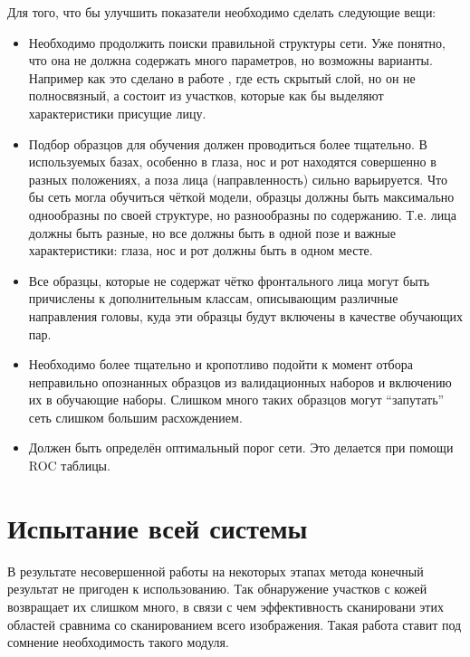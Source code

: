 \documentclass[12pt]{report}
\newenvironment{myItemize}{
 	\vspace{-10pt}
	\begin{itemize}[nolistsep]
}{\end{itemize}}
\begin{document}
Для того, что бы улучшить показатели необходимо сделать следующие вещи:
\begin{myItemize}
\item Необходимо продолжить поиски правильной структуры сети. Уже понятно, что она не должна содержать много 
параметров, но возможны варианты. Например как это сделано в работе \citep{rowley1998neural}, где есть скрытый 
слой, 
но он не полносвязный, а состоит из участков, которые как бы выделяют характеристики присущие лицу.
\item Подбор образцов для обучения должен проводиться более тщательно. В используемых базах, особенно в \citep
{huang2007labeled} глаза, нос и рот находятся совершенно в разных положениях, а поза лица (направленность) сильно 
варьируется. Что бы сеть могла обучиться чёткой модели, образцы должны быть максимально однообразны по своей 
структуре, но разнообразны по содержанию. Т.е. лица должны быть разные, но все должны быть в одной позе и важные 
характеристики: глаза, нос и рот должны быть в одном месте.
\item Все образцы, которые не содержат чётко фронтального лица могут быть причислены к дополнительным классам, 
описывающим различные направления головы, куда эти образцы будут включены в качестве обучающих пар.
\item Необходимо более тщательно и кропотливо подойти к момент отбора неправильно опознанных образцов из 
валидационных наборов и включению их в обучающие наборы. Слишком много таких образцов могут ``запутать'' сеть 
слишком 
большим расхождением.
\item Должен быть определён оптимальный порог сети. Это делается при помощи ROC таблицы.
\end{myItemize}


\section{Испытание всей системы}

В результате несовершенной работы на некоторых этапах метода конечный результат не пригоден к использованию. Так 
обнаружение участков с кожей возвращает их слишком много, в связи с чем эффективность сканировани этих областей 
сравнима со сканированием всего изображения. Такая работа ставит под сомнение необходимость такого модуля.
\end{document}
